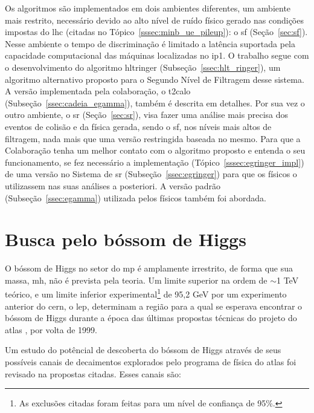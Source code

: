 Os algoritmos são implementados em dois ambientes diferentes, um ambiente mais
restrito, necessário devido ao alto nível de ruído físico gerado nas condições 
impostas do \gls{lhc} (citadas no Tópico~\ref{sssec:minb_ue_pileup}): o
\glsdesc{sf} (Seção~\ref{sec:sf}). Nesse ambiente o tempo de discriminação 
é limitado a latência suportada pela capacidade computacional das máquinas localizadas 
no \gls{ip}1. O trabalho segue com o desenvolvimento do algoritmo
\acrlong{hltringer} (Subseção~\ref{ssec:hlt_ringer}), um algoritmo alternativo proposto para o
Segundo Nível de Filtragem desse sistema. A versão implementada pela
colaboração, o \gls{t2calo} (Subseção~\ref{ssec:cadeia_egamma}), 
também é descrita em detalhes. Por sua vez o outro ambiente, o \glsdesc{sr}
(Seção~\ref{sec:sr}), visa fazer uma análise mais precisa dos eventos de colisão e da 
física gerada, sendo o \glsdesc{sf}, nos níveis mais altos de filtragem, 
nada mais que uma versão restringida baseada no mesmo. Para que a Colaboração tenha 
um melhor contato com o algoritmo proposto e entenda o seu funcionamento, se fez
necessário a implementação (Tópico~\ref{sssec:egringer_impl}) de uma versão no Sistema 
de \glsdesc{sr} (Subseção~\ref{ssec:egringer}) para que os físicos o utilizassem nas suas 
análises a posteriori. A versão padrão (Subseção~\ref{ssec:egamma}) utilizada
pelos físicos também foi abordada.

\section{Busca pelo bóssom de Higgs}
\label{sec:busca_higgs}


O bóssom de Higgs no setor do \gls{mp} é amplamente irrestrito, de forma que sua
massa, \acrshort{mh}, não é prevista pela teoria. Um limite superior na ordem de
$\sim$1 TeV teórico, e um limite inferior experimental\footnote{As exclusões
citadas foram feitas para um nível de confiança de 95\%.\label{fn:95cl}} de 95,2
GeV \cite{lep_higgs_1999} por um experimento anterior do \gls{cern}, o \gls{lep}, determinam a região para a qual
se esperava encontrar o bóssom de Higgs durante a época das últimas propostas técnicas
do projeto do \gls{atlas} \cite{ATLAS_TDR,ATLAS_TDR2}, por volta de 1999. 

Um estudo do potêncial de descoberta do bóssom de Higgs através de seus
possíveis canais de decaimentos explorados pelo programa de física do
\gls{atlas} foi revisado na propostas citadas. Esses canais são:

